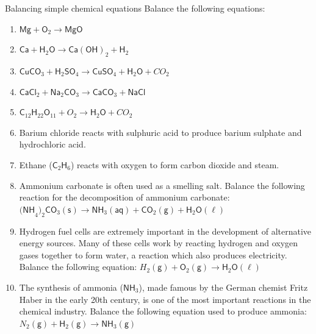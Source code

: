             \begin{exercises}{ Balancing simple chemical equations
        }
            \nopagebreak
 \label{m38726*id65193}Balance the following equations:\par 
 \label{m38726*id65199}\begin{enumerate}[noitemsep, label=\textbf{\arabic*}. ] 
  \label{m38726*uid19}\item  $\mathsf{Mg} + \mathsf{O}_{2} \to \mathsf{MgO}$
\label{m38726*uid20}\item ${\mathsf{Ca}}+{\mathsf{H}}_{2}\mathsf{O} \to \mathsf{Ca(OH)}_{2} + \mathsf{H}_{2}$
\label{m38726*uid21}\item ${\mathsf{CuCO}}_{3} + {\mathsf{H}}_{2}{\mathsf{SO}}_{4} \to \mathsf{CuSO}_{4} + {\mathsf{H}}_{2}\mathsf{O} + {CO}_{2}$
\label{m38726*uid22}\item $\mathsf{CaCl}_{2} + {\mathsf{Na}}_{2}{\mathsf{CO}}_{3} \to \mathsf{CaCO}_{3} + {\mathsf{NaCl}}$        \label{m38726*uid23}\item ${\mathsf{C}}_{12}{\mathsf{H}}_{22}{\mathsf{O}}_{11} + {{O}}_{2} \to \mathsf{H}_{2}\mathsf{O} + {{CO}}_{2}$
\label{m38726*uid24}\item Barium chloride reacts with sulphuric acid to produce barium sulphate and hydrochloric acid.
\label{m38726*uid25}\item Ethane (${\mathsf{C}}_{2}{\mathsf{H}}_{6}$) reacts with oxygen to form carbon dioxide and steam.
\label{m38726*uid26}\item Ammonium carbonate is often used as a smelling salt. Balance the following reaction for the decomposition of ammonium carbonate: ${\mathsf{(NH}}_{4}\mathsf{)}_{2}{\mathsf{CO}}_{3} \mathsf{(s)} \to {\mathsf{NH}}_{3}\mathsf{(aq)} + {\mathsf{CO}}_{2} \mathsf{(g)} + \mathsf{H}_{2}\mathsf{O} \mathsf{(\ell)} $ 
\label{m38726*uid17}\item Hydrogen fuel cells are extremely important in the development of alternative energy sources. Many of these cells work by reacting hydrogen and oxygen gases together to form water, a reaction which also produces electricity. Balance the following equation: ${{H}}_{2} \mathsf{(g)} + \mathsf{O}_{2} \mathsf{(g)} \to \mathsf{H}_{2}\mathsf{O} \mathsf{(\ell)}$    
\label{m38726*uid18}\item The synthesis of ammonia ($\mathsf{NH}_{3}$), made famous by the German chemist Fritz Haber in the early 20th century, is one of the most important reactions in the chemical industry. Balance the following equation used to produce ammonia:
${{N}}_{2} \mathsf{(g)} + \mathsf{H}_{2} \mathsf{(g)} \to \mathsf{NH}_{3} \mathsf{(g)}$

\end{enumerate}
\end{exercises}
